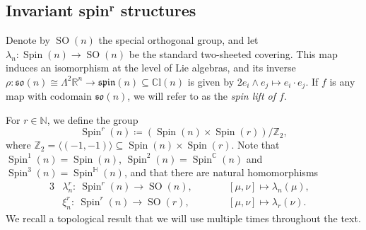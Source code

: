 \documentclass[pdftex]{sigma}
\numberwithin{equation}{section}
\newcommand{\R}{\mathbb{R}} %
\DeclareMathOperator{\SO}{SO}
\DeclareMathOperator{\Spin}{Spin}
\begin{document}
\subsection[Invariant spin\^{}r structures]{Invariant spin$^{\boldsymbol{r}}$ structures}
		
		Denote by $\SO(n)$ the special orthogonal group, and let $\lambda_n \colon \Spin(n) \to \SO(n)$ be the standard two-sheeted covering. This map induces an isomorphism at the level of Lie algebras, and its inverse $\rho \colon \mathfrak{so}(n) \cong \Lambda^2 \R^n \to \mathfrak{spin}(n) \subseteq \mathbb{C}\mathrm{l}(n)$ is given by $2 e_i \wedge e_j \mapsto e_i \cdot e_j$. If $f$ is any map with codomain $\mathfrak{so}(n)$, we will refer to  as the \textit{spin lift of $f$}.
		
		For $r \in \mathbb{N}$, we define the group
		\[
		\Spin^r(n) \coloneqq (\Spin(n) \times \Spin(r) ) / \mathbb{Z}_2 ,
		\]
		where $\mathbb{Z}_2 = \langle(-1,-1)\rangle \subseteq \Spin(n) \times \Spin(r)$. Note that $\Spin^1(n) = \Spin(n)$, $\Spin^2(n) = \Spin^{\mathbb{C}}(n)$ and $\Spin^3(n) = \Spin^{\mathbb{H}}(n)$, and that there are natural homomorphisms
		\begin{alignat*}{3}
			& \lambda^{r}_n \colon\ \Spin^{r}(n) \to \SO(n) , \qquad&& [\mu,\nu] \mapsto \lambda_n(\mu),& \\
			& \xi^{r}_n \colon\ \Spin^{r}(n) \to \SO(r), \qquad&& [\mu,\nu] \mapsto \lambda_r(\nu).&
		\end{alignat*}
		We recall a topological result that we will use multiple times throughout the text.
\end{document}
